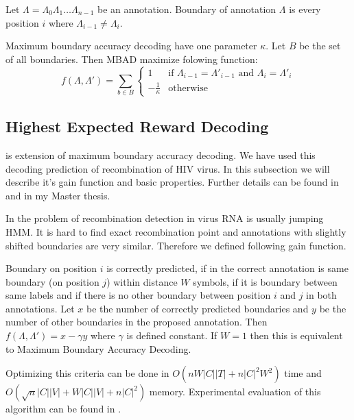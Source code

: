 \begin{definition}
Let $\Lambda=\Lambda_0\Lambda_1\dots\Lambda_{n-1}$ be an annotation. Boundary of
annotation $\Lambda$ is every position $i$ where $\Lambda_{i-1}\not=\Lambda_i$. 
\end{definition}

Maximum boundary accuracy decoding have one parameter $\kappa$. Let $B$ be the
set of all boundaries. Then MBAD maximize folowing function:
\begin{equation}
f(\Lambda,\Lambda')=\sum_{b\in B}
\begin{cases}
1 & \text{if $\Lambda_{i-1}=\Lambda'_{i-1}$ and $\Lambda_{i}=\Lambda'_{i}$}\\
-\frac1\kappa & \text{otherwise}
\end{cases}
\end{equation}

\subsection{Highest Expected Reward Decoding}

 is extension of maximum
boundary accuracy decoding. We have used this decoding prediction of
recombination of HIV virus. In this subsection we will describe it's gain
function and basic properties. Further details can be found in \cite{} and in my
Master thesis\cite{}.


In the problem of recombination detection in virus RNA is usually jumping
HMM\cite{}. It is hard to find exact recombination point and annotations with
slightly shifted boundaries are very similar. Therefore we defined following
gain function.

Boundary on position $i$ is correctly predicted, if in the correct annotation is
same boundary (on position $j$) within distance $W$ symbols, if it is boundary
between same labels and if there is no other boundary between position $i$ and
$j$ in both annotations. Let $x$ be the number of correctly predicted boundaries
and $y$ be the number of other boundaries in the proposed annotation. Then
$f(\Lambda,\Lambda')=x-\gamma y$ where $\gamma$ is defined constant. If $W=1$
then this is equivalent to Maximum Boundary Accuracy Decoding.

Optimizing this criteria can be done in $O(nW|C||T| + n|C|^2W^2)$ time  and
$O(\sqrt{n}|C||V|+W|C||V|+n|C|^2)$ memory. Experimental evaluation of this
algorithm can be found in \cite{}.

